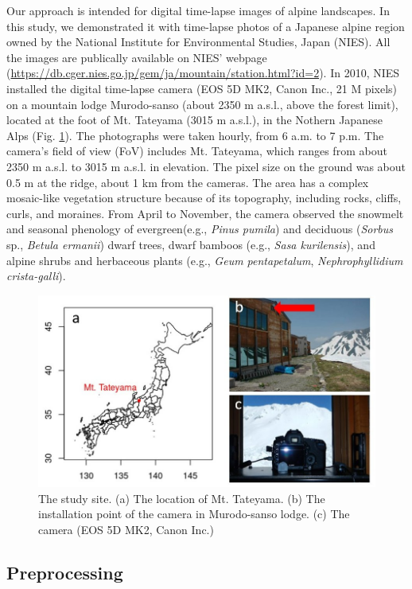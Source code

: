 \documentclass{article}
\begin{document}
Our approach is intended for digital time-lapse images of alpine landscapes. In this study, we demonstrated it with time-lapse photos of a Japanese alpine region owned by the National Institute for Environmental Studies, Japan (NIES). All the images are publically available on NIES' webpage (\url{https://db.cger.nies.go.jp/gem/ja/mountain/station.html?id=2}). In 2010, NIES installed the digital time-lapse camera (EOS 5D MK2, Canon Inc., 21 M pixels) on a mountain lodge Murodo-sanso (about 2350 m a.s.l., above the forest limit), located at the foot of Mt. Tateyama (3015 m a.s.l.), in the Nothern Japanese Alps (Fig. \ref{fig:map}). The photographs were taken hourly, from 6 a.m. to 7 p.m. The camera's field of view (FoV) includes Mt. Tateyama, which ranges from about 2350 m a.s.l. to 3015 m a.s.l. in elevation. The pixel size on the ground was about 0.5 m at the ridge, about 1 km from the cameras. The area has a complex mosaic-like vegetation structure because of its topography, including rocks, cliffs, curls, and moraines. From April to November, the camera observed the snowmelt and seasonal phenology of evergreen(e.g., \emph{Pinus pumila}) and deciduous (\emph{Sorbus} sp., \emph{Betula ermanii}) dwarf trees, dwarf bamboos (e.g., \emph{Sasa kurilensis}), and alpine shrubs and herbaceous plants (e.g., \emph{Geum pentapetalum}, \emph{Nephrophyllidium crista-galli}).



\begin{figure}
\includegraphics[width=1\linewidth]{paper_files/figures/Slide3} \caption{The study site. (a) The location of Mt. Tateyama. (b) The installation point of the camera in Murodo-sanso lodge. (c) The camera (EOS 5D MK2, Canon Inc.)}\label{fig:map}
\end{figure}

\hypertarget{preprocessing}{%
\subsection{Preprocessing}\label{preprocessing}}
\end{document}
